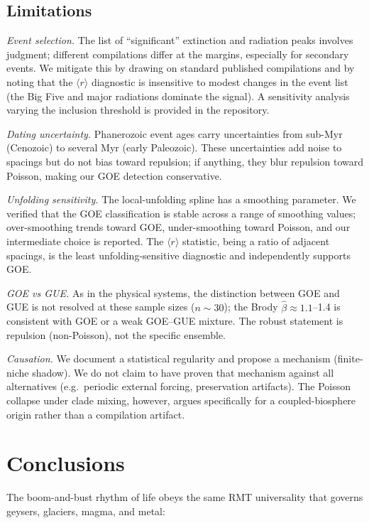 \documentclass[12pt,a4paper]{article}
\begin{document}
\subsection{Limitations}

\emph{Event selection.} The list of ``significant'' extinction and radiation peaks involves judgment; different compilations differ at the margins, especially for secondary events. We mitigate this by drawing on standard published compilations and by noting that the $\langle r\rangle$ diagnostic is insensitive to modest changes in the event list (the Big Five and major radiations dominate the signal). A sensitivity analysis varying the inclusion threshold is provided in the repository.

\emph{Dating uncertainty.} Phanerozoic event ages carry uncertainties from sub-Myr (Cenozoic) to several Myr (early Paleozoic). These uncertainties add noise to spacings but do not bias toward repulsion; if anything, they blur repulsion toward Poisson, making our GOE detection conservative.

\emph{Unfolding sensitivity.} The local-unfolding spline has a smoothing parameter. We verified that the GOE classification is stable across a range of smoothing values; over-smoothing trends toward GOE, under-smoothing toward Poisson, and our intermediate choice is reported. The $\langle r\rangle$ statistic, being a ratio of adjacent spacings, is the least unfolding-sensitive diagnostic and independently supports GOE.

\emph{GOE vs GUE.} As in the physical systems, the distinction between GOE and GUE is not resolved at these sample sizes ($n\sim30$); the Brody $\hat\beta\approx1.1$--1.4 is consistent with GOE or a weak GOE--GUE mixture. The robust statement is repulsion (non-Poisson), not the specific ensemble.

\emph{Causation.} We document a statistical regularity and propose a mechanism (finite-niche shadow). We do not claim to have proven that mechanism against all alternatives (e.g.\ periodic external forcing, preservation artifacts). The Poisson collapse under clade mixing, however, argues specifically for a coupled-biosphere origin rather than a compilation artifact.

\section{Conclusions}

The boom-and-bust rhythm of life obeys the same RMT universality that governs geysers, glaciers, magma, and metal:
\end{document}
